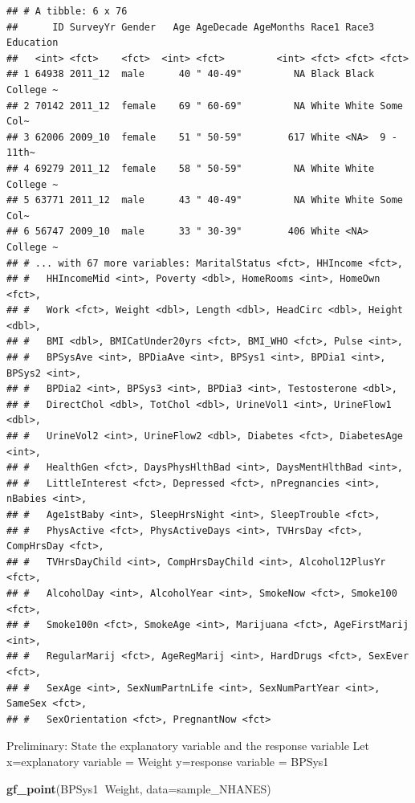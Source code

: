 \documentclass[
]{book}
\newenvironment{Shaded}{\begin{snugshade}}{\end{snugshade}}
\newcommand{\DataTypeTok}[1]{\textcolor[rgb]{0.13,0.29,0.53}{#1}}
\newcommand{\KeywordTok}[1]{\textcolor[rgb]{0.13,0.29,0.53}{\textbf{#1}}}
\newcommand{\NormalTok}[1]{#1}
\newcommand{\OperatorTok}[1]{\textcolor[rgb]{0.81,0.36,0.00}{\textbf{#1}}}
\begin{document}
\begin{verbatim}
## # A tibble: 6 x 76
##      ID SurveyYr Gender   Age AgeDecade AgeMonths Race1 Race3 Education
##   <int> <fct>    <fct>  <int> <fct>         <int> <fct> <fct> <fct>    
## 1 64938 2011_12  male      40 " 40-49"         NA Black Black College ~
## 2 70142 2011_12  female    69 " 60-69"         NA White White Some Col~
## 3 62006 2009_10  female    51 " 50-59"        617 White <NA>  9 - 11th~
## 4 69279 2011_12  female    58 " 50-59"         NA White White College ~
## 5 63771 2011_12  male      43 " 40-49"         NA White White Some Col~
## 6 56747 2009_10  male      33 " 30-39"        406 White <NA>  College ~
## # ... with 67 more variables: MaritalStatus <fct>, HHIncome <fct>,
## #   HHIncomeMid <int>, Poverty <dbl>, HomeRooms <int>, HomeOwn <fct>,
## #   Work <fct>, Weight <dbl>, Length <dbl>, HeadCirc <dbl>, Height <dbl>,
## #   BMI <dbl>, BMICatUnder20yrs <fct>, BMI_WHO <fct>, Pulse <int>,
## #   BPSysAve <int>, BPDiaAve <int>, BPSys1 <int>, BPDia1 <int>, BPSys2 <int>,
## #   BPDia2 <int>, BPSys3 <int>, BPDia3 <int>, Testosterone <dbl>,
## #   DirectChol <dbl>, TotChol <dbl>, UrineVol1 <int>, UrineFlow1 <dbl>,
## #   UrineVol2 <int>, UrineFlow2 <dbl>, Diabetes <fct>, DiabetesAge <int>,
## #   HealthGen <fct>, DaysPhysHlthBad <int>, DaysMentHlthBad <int>,
## #   LittleInterest <fct>, Depressed <fct>, nPregnancies <int>, nBabies <int>,
## #   Age1stBaby <int>, SleepHrsNight <int>, SleepTrouble <fct>,
## #   PhysActive <fct>, PhysActiveDays <int>, TVHrsDay <fct>, CompHrsDay <fct>,
## #   TVHrsDayChild <int>, CompHrsDayChild <int>, Alcohol12PlusYr <fct>,
## #   AlcoholDay <int>, AlcoholYear <int>, SmokeNow <fct>, Smoke100 <fct>,
## #   Smoke100n <fct>, SmokeAge <int>, Marijuana <fct>, AgeFirstMarij <int>,
## #   RegularMarij <fct>, AgeRegMarij <int>, HardDrugs <fct>, SexEver <fct>,
## #   SexAge <int>, SexNumPartnLife <int>, SexNumPartYear <int>, SameSex <fct>,
## #   SexOrientation <fct>, PregnantNow <fct>
\end{verbatim}

Preliminary: State the explanatory variable and the response variable
Let x=explanatory variable = Weight
y=response variable = BPSys1



\begin{Shaded}
\begin{Highlighting}[]
\KeywordTok{gf_point}\NormalTok{(BPSys1}\OperatorTok{~}\NormalTok{Weight, }\DataTypeTok{data=}\NormalTok{sample_NHANES)}
\end{Highlighting}
\end{Shaded}
\end{document}
